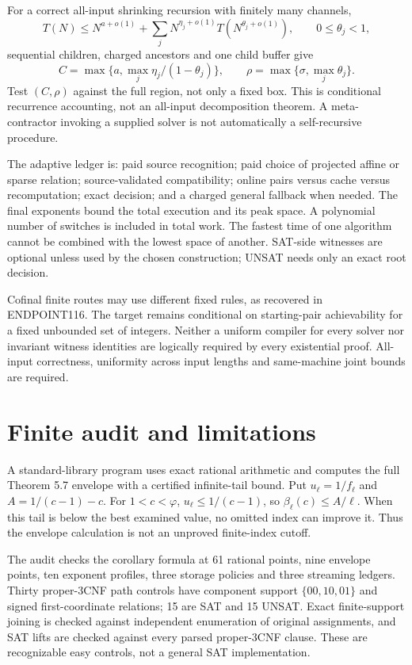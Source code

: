\documentclass[11pt]{article}
\begin{document}
For a correct all-input shrinking recursion with finitely many channels,
\[
T(N)\le N^{a+o(1)}+\sum_jN^{\eta_j+o(1)}T(N^{\theta_j+o(1)}),\qquad0\le\theta_j<1,
\]
sequential children, charged ancestors and one child buffer give
\[
C=\max\{a,\max_j\eta_j/(1-\theta_j)\},\qquad
\rho=\max\{\sigma,\max_j\theta_j\}.
\]
Test $(C,\rho)$ against the full region, not only a fixed box. This is conditional recurrence accounting, not an all-input decomposition theorem. A meta-contractor invoking a supplied solver is not automatically a self-recursive procedure.

The adaptive ledger is: paid source recognition; paid choice of projected affine or sparse relation; source-validated compatibility; online pairs versus cache versus recomputation; exact decision; and a charged general fallback when needed. The final exponents bound the total execution and its peak space. A polynomial number of switches is included in total work. The fastest time of one algorithm cannot be combined with the lowest space of another. SAT-side witnesses are optional unless used by the chosen construction; UNSAT needs only an exact root decision.

Cofinal finite routes may use different fixed rules, as recovered in ENDPOINT116. The target remains conditional on starting-pair achievability for a fixed unbounded set of integers. Neither a uniform compiler for every solver nor invariant witness identities are logically required by every existential proof. All-input correctness, uniformity across input lengths and same-machine joint bounds are required.

\section{Finite audit and limitations}
A standard-library program uses exact rational arithmetic and computes the full Theorem 5.7 envelope with a certified infinite-tail bound. Put $u_\ell=1/f_\ell$ and $A=1/(c-1)-c$. For $1<c<\varphi$, $u_\ell\le1/(c-1)$, so $\beta_\ell(c)\le A/\ell$. When this tail is below the best examined value, no omitted index can improve it. Thus the envelope calculation is not an unproved finite-index cutoff.

The audit checks the corollary formula at 61 rational points, nine envelope points, ten exponent profiles, three storage policies and three streaming ledgers. Thirty proper-3CNF path controls have component support $\{00,10,01\}$ and signed first-coordinate relations; 15 are SAT and 15 UNSAT. Exact finite-support joining is checked against independent enumeration of original assignments, and SAT lifts are checked against every parsed proper-3CNF clause. These are recognizable easy controls, not a general SAT implementation.
\end{document}
